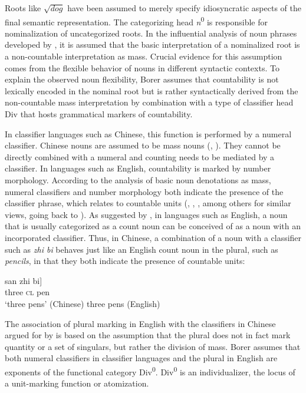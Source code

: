 \documentclass[output=paper,colorlinks,citecolor=brown]{langscibook}
\begin{document}
Roots like $\sqrt{dog}$ have been assumed to merely specify idiosyncratic aspects of the final semantic representation. The categorizing head \textit{n}\textsuperscript{0} is responsible for nominalization of uncategorized roots. In the influential analysis of noun phrases developed by \citet{Borer2005}, it is assumed that the basic interpretation of a nominalized root is a non-countable interpretation as mass. Crucial evidence for this assumption comes from the flexible behavior of nouns in different syntactic contexts. To explain the observed noun flexibility, Borer assumes that countability is not lexically encoded in the nominal root but is rather syntactically derived from the non-countable mass interpretation by combination with a type of classifier head Div that hosts grammatical markers of countability. 

In classifier languages such as Chinese, this function is performed by a numeral classifier. Chinese nouns are assumed to be mass nouns (\citealt{Chierchia1998}, \citealt{Krifka1995}). They cannot be directly combined with a numeral and counting needs to be mediated by a classifier. In languages such as English, countability is marked by number morphology. According to the analysis of basic noun denotations as mass, numeral classifiers and number morpho\-logy both indicate the presence of the classifier phrase, which relates to countable units (\citealt{Li2013}, \citealt{ChengSybesma1999}, \citealt{Chierchia1998}, among others for similar views, going back to \citealt{Greenberg1972}). As suggested by \citet{Kratzer2007}, in languages such as English, a noun that is usually categorized as a count noun can be conceived of as a noun with an incorporated classifier. Thus, in Chinese, a combination of a noun with a classifier such as \textit{zhi bi} behaves just like an English count noun in the plural, such as \textit{pencils}, in that they both indicate the presence of countable units:

\ea\label{ex:geist:2}
\ea
\gll san \minsp{[} zhi bi] \\ 
     three {} \textsc{cl} pen \\ 
\glt `three pens' \hfill (Chinese)
\label{ex:geist:2a}
\ex three pens \hfill (English) 
\label{ex:geist:2b}
\z\z

\newpage
\noindent The association of plural marking in English with the classifiers in Chinese argued for by \citet{Borer2005} is based on the assumption that the plural does not in fact mark quantity or a set of singulars, but rather the division of mass. Borer assumes that both numeral classifiers in classifier languages and the plural in English are exponents of the functional category Div\textsuperscript{0}. Div\textsuperscript{0} is an individualizer, the locus of a unit-marking function or atomization. 
\end{document}
